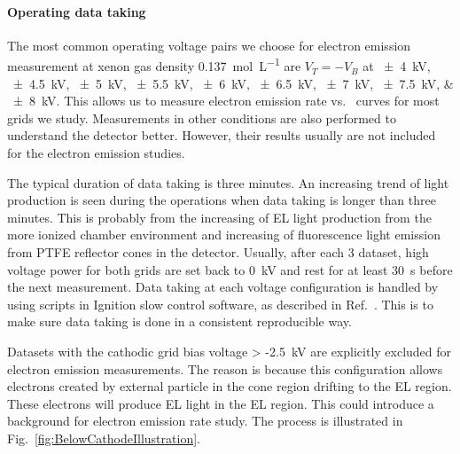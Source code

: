 \paragraph{Operating data taking} %
The most common operating voltage pairs we choose for electron emission measurement at xenon gas density \SI{0.137}{\mole\per\liter} are $V_{T}=-V_{B} $ at \SIlist{\pm 4; \pm 4.5; \pm 5; \pm 5.5;\pm 6; \pm 6.5;\pm 7; \pm 7.5;\pm 8}{\kV}. This allows us to measure electron emission rate vs. \opdv\ curves for most grids we study. Measurements in other conditions are also performed to understand the detector better. However, their results usually are not included for the electron emission studies.

The typical duration of data taking is three minutes. An increasing trend of light production is seen during the operations when data taking is longer than three minutes. This is probably from the increasing of EL light production from the more ionized chamber environment and increasing of fluorescence light emission from PTFE reflector cones in the detector. Usually, after each \SI{3}{\min} dataset, high voltage power for both grids are set back to \SI{0}{\kV} and rest for at least \SI{30}{\s} before the next measurement. Data taking at each voltage configuration is handled by using scripts in Ignition slow control software, as described in Ref.~\cite{Ignition2018}. This is to make sure data taking is done in a consistent reproducible way.

Datasets with the cathodic grid bias voltage \SI{> -2.5}{\kV} are explicitly excluded for electron emission measurements. The reason is because this configuration allows electrons created by external particle in the cone region drifting to the EL region. These electrons will produce EL light in the EL region. This could introduce a background for electron emission rate study. The process is illustrated in Fig.~\ref{fig:BelowCathodeIllustration}.

